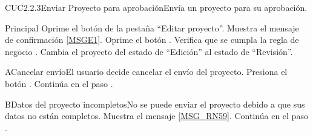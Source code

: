 
\begin{UseCase}{CUC2.2.3}{Enviar Proyecto para aprobación}{Envía un proyecto para su aprobación.}
\end{UseCase}
	
	
\begin{UCtrayectoria}{Principal}
		\UCpaso[\UCactor] Oprime el botón  de la pestaña ``Editar proyecto''.
		\UCpaso Muestra el mensaje  de confirmación \ref{MSGE1}.
		\UCpaso[\UCactor] Oprime el botón . 
		\UCpaso Verifica que se cumpla la regla de negocio . 
		\UCpaso Cambia el proyecto del estado de ``Edición'' al estado de ``Revisión''.
\end{UCtrayectoria}

\begin{UCtrayectoriaA}{A}{Cancelar envío}{El usuario decide cancelar el envío del proyecto.}
			\UCpaso[\UCactor] Presiona el botón .
			\UCpaso Continúa en el paso .
\end{UCtrayectoriaA}

\begin{UCtrayectoriaA}{B}{Datos del proyecto incompletos}{No se puede enviar el proyecto debido a que sus datos no están completos.}
			\UCpaso Muestra el mensaje \ref{MSG_RN59}.
			\UCpaso Continúa en el paso .
\end{UCtrayectoriaA}

